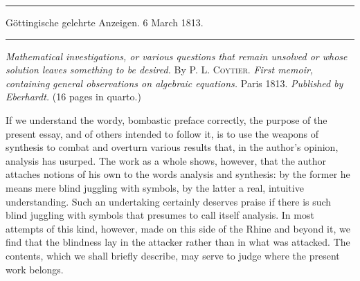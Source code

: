 \clearpage
{}
\begin{center}
\par\noindent\hfill\rule{0.30\linewidth}{0.4pt}\hfill\mbox{}\par
Göttingische gelehrte Anzeigen. 6 March 1813.
\par\noindent\hfill\rule{0.30\linewidth}{0.4pt}\hfill\mbox{}\par
\end{center}

\textit{Mathematical investigations, or various questions that remain unsolved or whose solution} \textit{leaves something to be desired.} By P. L. \textsc{Coytier.} \textit{First memoir, containing} \textit{general observations on algebraic equations.} Paris 1813. \textit{Published by Eberhardt.} (16 pages in quarto.)\par

If we understand the wordy, bombastic preface correctly, the purpose of the present essay, and of others intended to follow it, is to use the weapons of synthesis to combat and overturn various results that, in the author's opinion, analysis has usurped. The work as a whole shows, however, that the author attaches notions of his own to the words analysis and synthesis: by the former he means mere blind juggling with symbols, by the latter a real, intuitive understanding. Such an undertaking certainly deserves praise if there is such blind juggling with symbols that presumes to call itself analysis. In most attempts of this kind, however, made on this side of the Rhine and beyond it, we find that the blindness lay in the attacker rather than in what was attacked. The contents, which we shall briefly describe, may serve to judge where the present work belongs.\par

